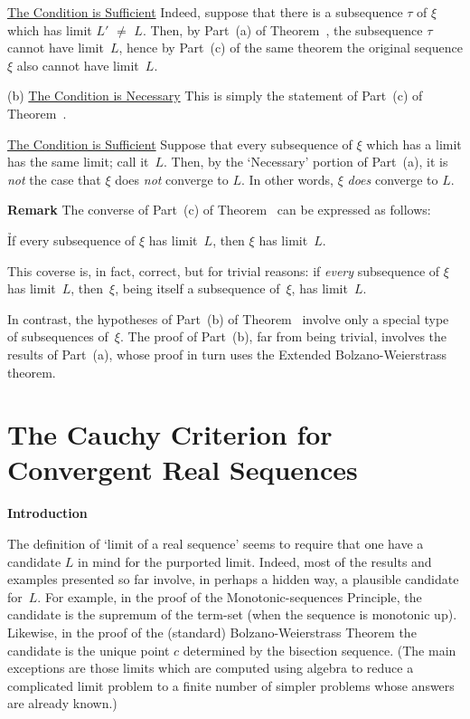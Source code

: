         \underline{The Condition is Sufficient} Indeed, suppose that there is a subsequence ${\tau}$ of ${\xi}$ which has limit $L' \,\,{\neq}\,\, L$.
    Then, by Part~(a) of Theorem~, the subsequence ${\tau}$ cannot have limit~$L$,
    hence by Part~(c) of the same theorem the original sequence ${\xi}$ also cannot have limit~$L$.

\V

        (b) \underline{The Condition is Necessary} This is simply the statement of Part~(c) of Theorem~.

        \underline{The Condition is Sufficient} Suppose that every subsequence of ${\xi}$ which has a limit has the same limit; call it~$L$.
    Then, by the `Necessary' portion of Part~(a), it is {\em not} the case that ${\xi}$ does {\em not} converge to $L$.
    In other words, ${\xi}$ {\em does} converge to $L$.

\V

        {\bf Remark} The converse of Part~(c) of Theorem~ can be expressed as follows:

\VA

         \h If every subsequence of ${\xi}$ has limit~$L$, then ${\xi}$ has limit~$L$.

\VA

\noindent This coverse is, in fact, correct, but for trivial reasons: if {\em every} subsequence of ${\xi}$ has limit~$L$,
    then~${\xi}$, being itself a subsequence of~${\xi}$, has limit~$L$.

        In contrast, the hypotheses of Part~(b) of Theorem~ involve only a special type of subsequences of~${\xi}$.
    The proof of Part~(b), far from being trivial, involves the results of Part~(a), whose proof in turn uses the Extended Bolzano-Weierstrass theorem.


\VV

                \section{{\bf The Cauchy Criterion for Convergent Real Sequences}}
                \label{SectC70}

        {\bf Introduction}

\V

        The definition of `limit of a real sequence' seems to require that one have a candidate $L$ in mind for the purported limit.
    Indeed, most of the results and examples presented so far involve, in perhaps a hidden way, a plausible candidate for~$L$.
    For example, in the proof of the Monotonic-sequences Principle, the candidate is the supremum of the term-set (when the sequence is monotonic up).
    Likewise, in the proof of the (standard) Bolzano-Weierstrass Theorem the candidate is the unique point $c$ determined by the bisection sequence.
    (The main exceptions are those limits which are computed using algebra to reduce
    a complicated limit problem to a finite number of simpler problems whose answers are already known.)

